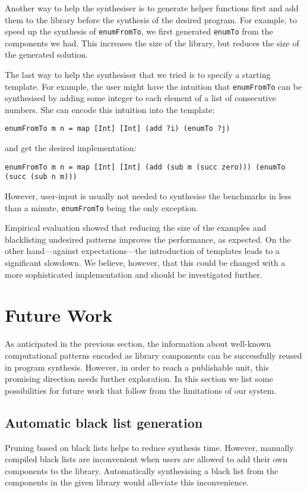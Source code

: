 Another way to help the synthesiser is to generate helper functions first and add them to the library before the synthesis of the desired program. For example, to speed up the synthesis of \lstinline!enumFromTo!, we first generated \lstinline!enumTo! from the components we had. This increases the size of the library, but reduces the size of the generated solution.

The last way to help the synthesiser that we tried is to specify a starting template. For example, the user might have the intuition that \lstinline!enumFromTo! can be synthesised by adding some integer to each element of a list of consecutive numbers. She can encode this intuition into the template:
\begin{lstlisting}[style=plain]
enumFromTo m n = map [Int] [Int] (add ?i) (enumTo ?j)
\end{lstlisting}
and get the desired implementation:
\begin{lstlisting}[style=plain]
enumFromTo m n = map [Int] [Int] (add (sub m (succ zero))) (enumTo (succ (sub n m)))
\end{lstlisting}
However, user-input is usually not needed to synthesise the benchmarks in less than a minute, \lstinline!enumFromTo! being the only exception.

Empirical evaluation showed that reducing the size of the examples and blacklisting undesired patterns improves the performance, as expected. On the other hand---against expectations---the introduction of templates leads to a significant slowdown. We believe, however, that this could be changed with a more sophisticated implementation and should be investigated further.
  
\section{Future Work}

As anticipated in the previous section, the information about well-known computational patterns encoded as library components can be successfully reused in program synthesis. However, in order to reach a publishable unit, this promising direction needs further exploration. In this section we list some possibilities for future work that follow from the limitations of our system.

\subsection{Automatic black list generation}
Pruning based on black lists helps to reduce synthesis time. However, manually compiled black lists are inconvenient when users are allowed to add their own components to the library. Automatically synthesising a black list from the components in the given library would alleviate this inconvenience.

